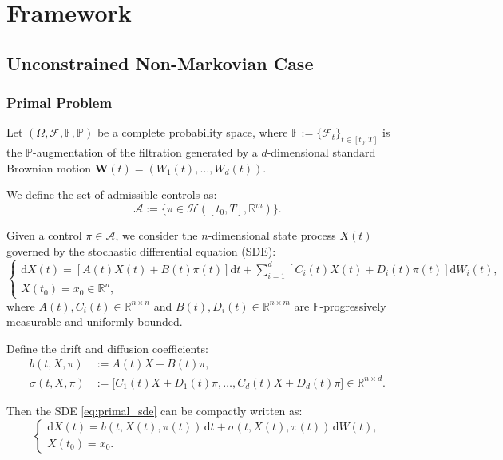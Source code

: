 
\chapter{Framework}

\section{Unconstrained Non-Markovian Case}


\subsection{Primal Problem}

Let $(\Omega, \mathcal{F}, \mathbb{F}, \mathbb{P})$ be a complete probability space, where $\mathbb{F} := \{ \mathcal{F}_t \}_{t \in [t_0, T]}$ is the $\mathbb{P}$-augmentation of the filtration generated by a $d$-dimensional standard Brownian motion $\bm{W}(t) = (W_1(t), \ldots, W_d(t))$. 

We define the set of admissible controls as:
\[
    \mathcal{A} := \big\{ \pi \in \mathcal{H}([t_0, T], \mathbb{R}^m) \big\}.
\]

Given a control $\pi \in \mathcal{A}$, we consider the $n$-dimensional state process $X(t)$ governed by the stochastic differential equation (SDE):
\begin{equation}
\label{eq:primal_sde}
\begin{cases}
    \mathrm{d}X(t) = \left[ A(t) X(t) + B(t)\pi(t) \right] \mathrm{d}t + \sum_{i=1}^d \left[ C_i(t) X(t) + D_i(t) \pi(t) \right] \mathrm{d}W_i(t), \\
    X(t_0) = x_0 \in \mathbb{R}^n,
\end{cases}
\end{equation}
where $A(t), C_i(t) \in \mathbb{R}^{n \times n}$ and $B(t), D_i(t) \in \mathbb{R}^{n \times m}$ are $\mathbb{F}$-progressively measurable and uniformly bounded.

Define the drift and diffusion coefficients:
\begin{align*}
    b(t, X, \pi) &:= A(t) X + B(t) \pi, \\
    \sigma(t, X, \pi) &:= \big[ C_1(t) X + D_1(t)\pi, \ldots, C_d(t) X + D_d(t)\pi \big] \in \mathbb{R}^{n \times d}.
\end{align*}

Then the SDE \eqref{eq:primal_sde} can be compactly written as:
\begin{equation}
\label{eq:primal_sde_compact}
\begin{cases}
    \mathrm{d}X(t) = b(t, X(t), \pi(t)) \, \mathrm{d}t + \sigma(t, X(t), \pi(t)) \, \mathrm{d}W(t), \\
    X(t_0) = x_0.
\end{cases}
\end{equation}


